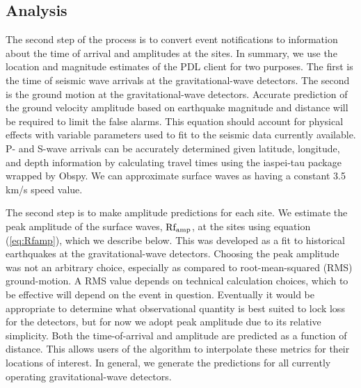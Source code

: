 \documentclass[reprint, prl, aps, showpacs]{revtex4-1}
\begin{document}
\subsection{Analysis}

The second step of the process is to convert event notifications to information about the time of arrival and amplitudes at the sites.
In summary, we use the location and magnitude estimates of the PDL client for two purposes. 
The first is the time of seismic wave arrivals at the gravitational-wave detectors.
The second is the ground motion at the gravitational-wave detectors.
Accurate prediction of the ground velocity amplitude based on earthquake magnitude and distance will be required to limit the false alarms. 
This equation should account for physical effects with variable parameters used to fit to the seismic data currently available.
P- and S-wave arrivals can be accurately determined given latitude, longitude, and depth information by calculating travel times using the iaspei-tau package \cite{Snoke2009} wrapped by Obspy. We can approximate surface waves as having a constant 3.5\,km/s speed value. 

The second step is to make amplitude predictions for each site. We estimate the peak amplitude of the surface waves, $\rm Rf_{amp}$, at the sites using equation (\ref{eq:Rfamp}), which we describe below. This was developed as a fit to historical earthquakes at the gravitational-wave detectors. Choosing the peak amplitude was not an arbitrary choice, especially as compared to root-mean-squared (RMS) ground-motion. A RMS value depends on technical calculation choices, which to be effective will depend on the event in question. Eventually it would be appropriate to determine what observational quantity is best suited to lock loss for the detectors, but for now we adopt peak amplitude due to its relative simplicity. Both the time-of-arrival and amplitude are predicted as a function of distance. This allows users of the algorithm to interpolate these metrics for their locations of interest. In general, we generate the predictions for all currently operating gravitational-wave detectors.
\end{document}

